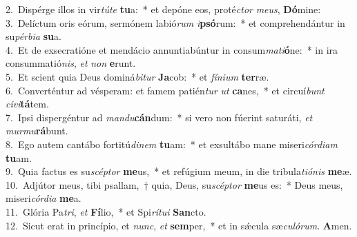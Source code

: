 {2.~}Dispérge illos in vir\textit{tú}\textit{te} \textbf{tu}a:~* et depóne eos, proté\textit{ctor} \textit{me}\textit{us}, \textbf{Dó}mine:\\
{3.~}Delíctum oris eórum, sermónem labió\textit{rum} \textit{i}\textbf{psó}rum:~* et comprehendántur in su\textit{pér}\textit{bi}\textit{a} \textbf{su}a.\\
{4.~}Et de exsecratióne et mendácio annuntiabúntur in consum\textit{ma}\textit{ti}\textbf{ó}ne:~* in ira consummatió\textit{nis}, \textit{et} \textit{non} \textbf{e}runt.\\
{5.~}Et scient quia Deus dominá\textit{bi}\textit{tur} \textbf{Ja}cob:~* et \textit{fí}\textit{ni}\textit{um} \textbf{ter}ræ.\\
{6.~}Converténtur ad vésperam: et famem patién\textit{tur} \textit{ut} \textbf{ca}nes,~* et circuí\textit{bunt} \textit{ci}\textit{vi}\textbf{tá}tem.\\
{7.~}Ipsi dispergéntur ad \textit{man}\textit{du}\textbf{cán}dum:~* si vero non fúerint saturáti, \textit{et} \textit{mur}\textit{mu}\textbf{rá}bunt.\\
{8.~}Ego autem cantábo fortitú\textit{di}\textit{nem} \textbf{tu}am:~* et exsultábo mane miseri\textit{cór}\textit{di}\textit{am} \textbf{tu}am.\\
{9.~}Quia factus es su\textit{scép}\textit{tor} \textbf{me}us,~* et refúgium meum, in die tribula\textit{ti}\textit{ó}\textit{nis} \textbf{me}æ.\\
{10.~}Adjútor meus, tibi psallam,~† quia, Deus, su\textit{scép}\textit{tor} \textbf{me}us es:~* Deus meus, miseri\textit{cór}\textit{di}\textit{a} \textbf{me}a.\\
{11.~}Glória Pa\textit{tri}, \textit{et} \textbf{Fí}lio,~* et Spi\textit{rí}\textit{tu}\textit{i} \textbf{San}cto.\\
{12.~}Sicut erat in princípio, et \textit{nunc}, \textit{et} \textbf{sem}per,~* et in sǽcula sæ\textit{cu}\textit{ló}\textit{rum}. \textbf{A}men.\\
